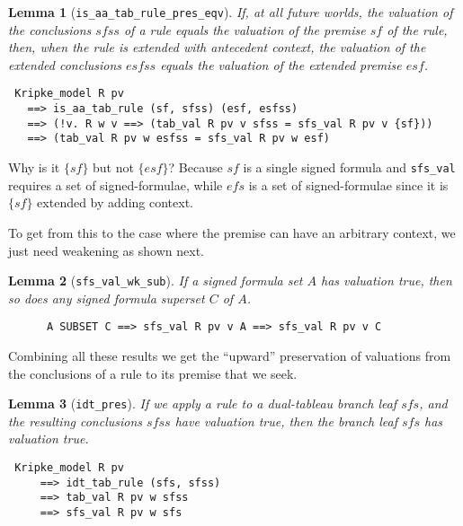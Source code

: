\documentclass[a4paper]{article}
\newtheorem{lemma}{Lemma}
\begin{document}
\begin{lemma}[\texttt{is\_aa\_tab\_rule\_pres\_eqv}] 
  \label{is-aa-tab-rule-pres-eqv}
  If, at all future worlds, the valuation of the conclusions
  $\mathit{sfss}$ of a rule
  equals the valuation of the premise $\mathit{sf}$ of the rule,
  then, when the rule is extended with antecedent context,
  the valuation of the  extended conclusions $\mathit{esfss}$
    equals the valuation of the extended premise $\mathit{esf}$.
\end{lemma}
\begin{verbatim}
 Kripke_model R pv 
   ==> is_aa_tab_rule (sf, sfss) (esf, esfss) 
   ==> (!v. R w v ==> (tab_val R pv v sfss = sfs_val R pv v {sf}))
   ==> (tab_val R pv w esfss = sfs_val R pv w esf)
\end{verbatim}
Why is it $\{sf\}$ but not $\{esf\}$?
Because $sf$ is a single signed formula and \texttt{sfs\_val} requires
a set of signed-formulae, while $efs$ is a set of signed-formulae since
it is $\{sf\}$ extended by adding context.

To get from this to the case where the premise can have an arbitrary context,
we just need weakening as shown next.

\begin{lemma}[\texttt{sfs\_val\_wk\_sub}] \label{sfs-val-wk-sub}
If a signed formula set $A$ has valuation true,
then so does any signed formula superset $C$ of $A$.
\end{lemma}
\begin{verbatim}
      A SUBSET C ==> sfs_val R pv v A ==> sfs_val R pv v C
\end{verbatim}

Combining all these results we get the ``upward'' preservation of
valuations from the conclusions of a rule to its premise that we seek.
\begin{lemma}[\texttt{idt\_pres}] \label{idt-pres}
  If we apply a rule to a dual-tableau branch leaf $\mathit{sfs}$,
  and the resulting conclusions $\mathit{sfss}$
  have valuation true,
  then the branch leaf $\mathit{sfs}$ has valuation true.
\end{lemma}
\begin{verbatim}
 Kripke_model R pv 
     ==> idt_tab_rule (sfs, sfss) 
     ==> tab_val R pv w sfss 
     ==> sfs_val R pv w sfs
\end{verbatim}
\end{document}
